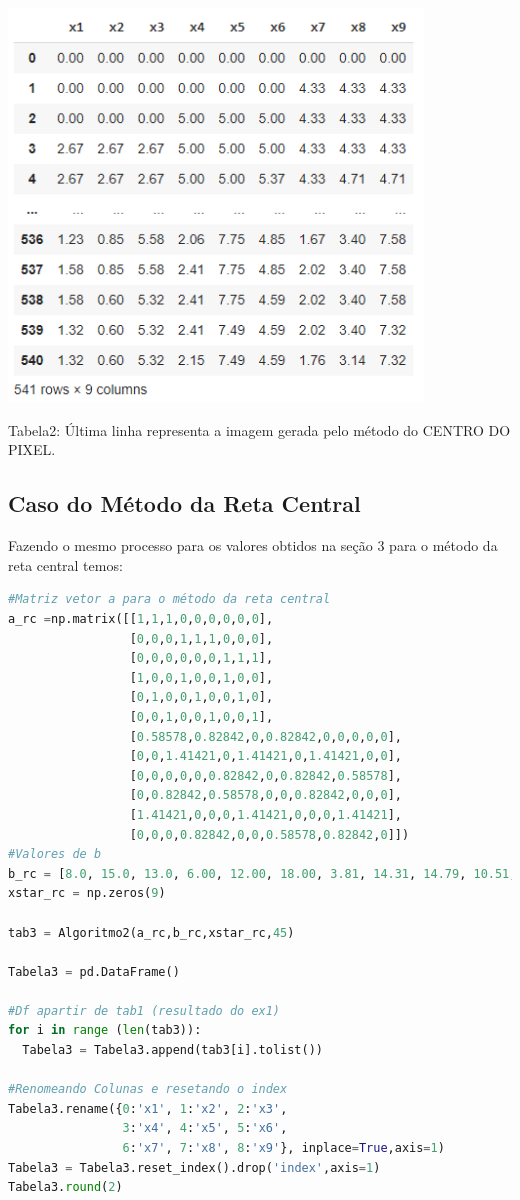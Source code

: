 \documentclass[a4paper, 12pt]{article}
\begin{document}
\begin{center}

\includegraphics[width=11cm]{109_saida_tabela_2.PNG}

Tabela2: Última linha representa a imagem gerada pelo método do CENTRO DO PIXEL.   
    
\end{center}


\subsection{Caso do Método da Reta Central}

Fazendo o mesmo processo para os valores obtidos na seção 3 para o método da reta central temos:

\begin{lstlisting}[language=Python, caption=Método da reta central: construindo a imagem, label=Método da reta central: construindo a imagem]
#Matriz vetor a para o método da reta central
a_rc =np.matrix([[1,1,1,0,0,0,0,0,0],
                 [0,0,0,1,1,1,0,0,0],
                 [0,0,0,0,0,0,1,1,1],
                 [1,0,0,1,0,0,1,0,0],
                 [0,1,0,0,1,0,0,1,0],
                 [0,0,1,0,0,1,0,0,1],
                 [0.58578,0.82842,0,0.82842,0,0,0,0,0],
                 [0,0,1.41421,0,1.41421,0,1.41421,0,0],
                 [0,0,0,0,0,0.82842,0,0.82842,0.58578],
                 [0,0.82842,0.58578,0,0,0.82842,0,0,0],
                 [1.41421,0,0,0,1.41421,0,0,0,1.41421],
                 [0,0,0,0.82842,0,0,0.58578,0.82842,0]])
#Valores de b
b_rc = [8.0, 15.0, 13.0, 6.00, 12.00, 18.00, 3.81, 14.31, 14.79, 10.51, 16.13, 7.04]
xstar_rc = np.zeros(9)  

tab3 = Algoritmo2(a_rc,b_rc,xstar_rc,45)

Tabela3 = pd.DataFrame()

#Df apartir de tab1 (resultado do ex1)
for i in range (len(tab3)):
  Tabela3 = Tabela3.append(tab3[i].tolist())

#Renomeando Colunas e resetando o index
Tabela3.rename({0:'x1', 1:'x2', 2:'x3', 
                3:'x4', 4:'x5', 5:'x6',
                6:'x7', 7:'x8', 8:'x9'}, inplace=True,axis=1)
Tabela3 = Tabela3.reset_index().drop('index',axis=1)
Tabela3.round(2)
\end{lstlisting}
\end{document}
